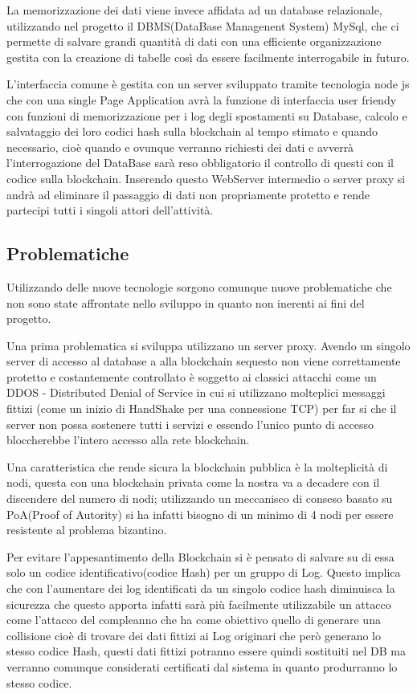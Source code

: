 \documentclass[12pt]{report}
\begin{document}
La memorizzazione dei dati viene invece affidata ad un database relazionale, utilizzando nel progetto il DBMS(DataBase Managenent System) MySql, che ci permette di salvare grandi quantità di dati con una efficiente organizzazione gestita con la creazione di tabelle così da essere facilmente interrogabile in futuro.
 
L'interfaccia comune è gestita con un server sviluppato tramite tecnologia node js che con una single Page Application avrà la funzione di interfaccia user friendy con funzioni di memorizzazione per i log degli spostamenti su Database, calcolo e salvataggio dei loro codici hash sulla blockchain al tempo stimato e quando necessario, cioè quando e ovunque verranno richiesti dei dati e avverrà l'interrogazione del DataBase sarà reso obbligatorio il controllo di questi con il codice sulla blockchain. Inserendo questo WebServer intermedio o server proxy si andrà ad eliminare il passaggio di dati non propriamente protetto e rende partecipi tutti i singoli attori dell'attività.

\subsection{Problematiche}
Utilizzando delle nuove tecnologie sorgono comunque nuove problematiche che non sono state affrontate nello sviluppo in quanto non inerenti ai fini del progetto.

Una prima problematica si sviluppa utilizzano un server proxy. Avendo un singolo server di accesso al database a alla blockchain sequesto non viene correttamente protetto e costantemente controllato è soggetto ai classici attacchi come un DDOS - Distributed Denial of Service in cui si utilizzano molteplici messaggi fittizi (come un inizio di HandShake per una connessione TCP) per far si che il server non possa sostenere tutti i servizi e essendo l'unico punto di accesso bloccherebbe  l'intero accesso alla rete blockchain.

Una caratteristica che rende sicura la blockchain pubblica è la molteplicità di nodi, questa con una blockchain privata come la nostra va a decadere con il discendere  del numero di nodi; utilizzando un meccanisco di conseso basato su PoA(Proof of Autority) si ha infatti bisogno di un minimo di 4 nodi per essere resistente al problema bizantino.

Per evitare l'appesantimento della Blockchain si è pensato di salvare su di essa solo un codice identificativo(codice Hash) per un gruppo di Log. Questo implica che con l'aumentare dei log identificati da un singolo codice hash diminuisca la sicurezza che questo apporta infatti sarà più facilmente utilizzabile un attacco come l'attacco del compleanno che ha come obiettivo quello di generare una collisione cioè di trovare dei dati fittizi ai Log originari che però generano lo stesso codice Hash, questi dati fittizi potranno essere quindi sostituiti nel DB ma verranno comunque considerati certificati dal sistema in quanto produrranno lo stesso codice.
\end{document}
